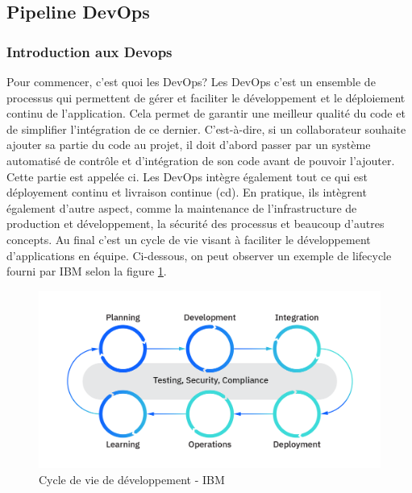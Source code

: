 \documentclass[
    iai, %
    il, %
]{heig-tb}
\begin{document}

\clearpage
\subsection{Pipeline DevOps}
\subsubsection{Introduction aux Devops}
Pour commencer, c'est quoi les DevOps?\newline
Les DevOps c'est un ensemble de processus qui permettent de gérer et faciliter le développement et le déploiement continu de l'application. Cela permet de garantir une meilleur qualité du code et de simplifier l'intégration de ce dernier. C'est-à-dire, si un collaborateur souhaite ajouter sa partie du code au projet, il doit d'abord passer par un système automatisé de contrôle et d'intégration de son code avant de pouvoir l'ajouter. Cette partie est appelée \Gls{ci}.\newline
Les DevOps intègre également tout ce qui est déployement continu et livraison continue (\Gls{cd}).
En pratique, ils intègrent également d'autre aspect, comme la maintenance de l'infrastructure de production et développement, la sécurité des processus et beaucoup d'autres concepts.\newline
Au final c'est un cycle de vie visant à faciliter le développement d'applications en équipe.\newline
Ci-dessous, on peut observer un exemple de lifecycle fourni par IBM selon la figure \ref{devops-lifecycle}.

\begin{center}
    \begin{figure}
        \includegraphics[width=\textwidth]{./assets/figures/ibm-devops-lifecycle.png}
        \caption[Cycle de vie de développement]{Cycle de vie de développement - IBM} \label{devops-lifecycle}
    \end{figure}
\end{center}
\end{document}
